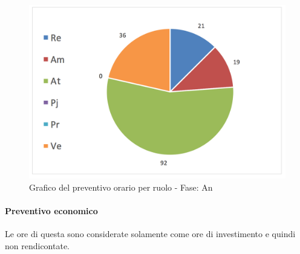 			\begin{figure}[H]
			\centering
			\includegraphics[scale=0.40]{img/h_r_An}
			\caption{Grafico del preventivo orario per ruolo - Fase: An}
			\label{fig:h_r_An"}
			\end{figure}

		\newpage
			\paragraph{Preventivo economico}
		Le ore di questa  sono considerate solamente come ore di investimento e quindi non rendicontate.\\


